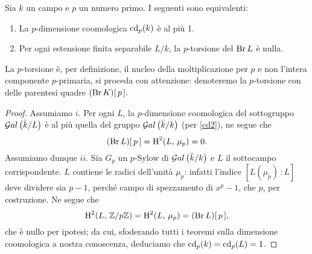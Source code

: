 \begin{lemma}
	Sia $ k $ un campo e $ p $ un numero primo. I seguenti sono equivalenti:
	\begin{enumerate}[label= \roman*.]
		\item La $ p $-dimensione coomologica $ \operatorname{cd}_p(k) $ è al più 1.
		\item Per ogni estensione finita separabile $ L/k $, la $ p $-torsione del $ \operatorname{Br} L $ è nulla.
	\end{enumerate}
\end{lemma}

La $ p $-torsione è, per definizione, il nucleo della moltiplicazione per $ p $ e non l'intera componente $ p $-primaria, si proceda con attenzione: denoteremo la $ p $-torsione con delle parentesi quadre $ (\operatorname{Br} K)[\, p \, ]. $


\begin{proof}
	Assumiamo $ i $. Per ogni $ L $, la $ p $-dimensione coomologica del sottogruppo $ \mathcal{G}al\left( \bar{k}/L \right) $ è al più quella del gruppo $ \mathcal{G}al\left( \bar{k}/k \right) $ (per \ref{cd2}), ne segue che
	\[ (\operatorname{Br} L) [\, p \,] = \operatorname{H}^2(L, \, \mu_p) = 0. \] 
	Assumiamo dunque $ ii $. Sia $ G_p $ un $ p $-Sylow di $ \mathcal{G}al\left( \bar{k}/k \right) $ e $ L $ il sottocampo corrispondente. $ L $ contiene le radici dell'unità $ \mu_p $: infatti l'indice $ [L(\mu_p)\,\colon L] $ deve dividere sia $ p-1 $, perché campo di spezzamento di $ x^p-1 $, che $ p $, per costruzione. Ne segue che
	\[ \operatorname{H}^2(L, \, \mathbb{Z}/p\mathbb{Z}) = \operatorname{H}^2(L, \, \mu_p) = (\operatorname{Br} L)[\, p\,], \]
	che è nullo per ipotesi; da cui, sfoderando tutti i teoremi sulla dimensione coomologica a nostra conoscenza, deduciamo che $ \operatorname{cd}_p(k) = \operatorname{cd}_p(L) = 1 $.
\end{proof}


